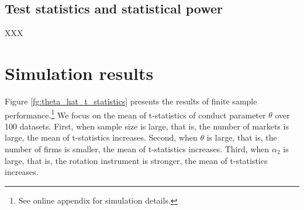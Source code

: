 \documentclass[11pt, a4paper]{article}
\begin{document}
\subsection{Test statistics and statistical power}

XXX

\section{Simulation results}\label{sec:results}

Figure \ref{fg:theta_hat_t_statistics} presents the results of finite sample performance.\footnote{See online appendix for simulation details.}
We focus on the mean of t-statistics of conduct parameter $\theta$ over 100 datasets. 
First, when sample size is large, that is, the number of markets is large, the mean of t-statistics increases. %
Second, when $\theta$ is large, that is, the number of firms is smaller, the mean of t-statistics increases. %
Third, when $\alpha_2$ is large, that is, the rotation instrument is stronger, the mean of t-statistics increases. %
\end{document}
